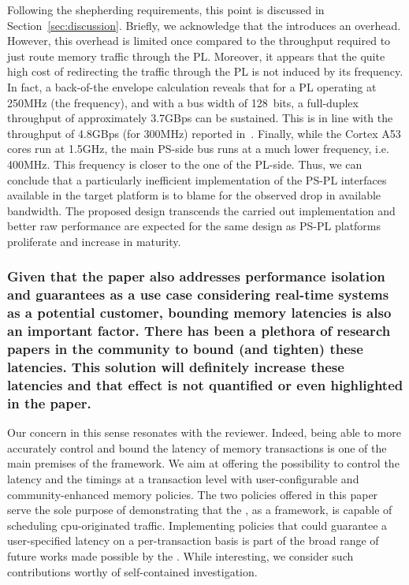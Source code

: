         Following the shepherding requirements, this point is
        discussed in Section~\ref{sec:discussion}. Briefly, we
        acknowledge that the \schim introduces an overhead. However,
        this overhead is limited once compared to the throughput
        required to just route memory traffic through the
        PL. Moreover, it appears that the quite high cost of
        redirecting the traffic through the PL is not induced by its
        frequency. In fact, a back-of-the envelope calculation reveals
        that for a PL operating at 250MHz (the \schim frequency), and
        with a bus width of 128~bits, a full-duplex throughput of
        approximately 3.7GBps can be sustained. This is in line with
        the throughput of 4.8GBps (for 300MHz) reported
        in~\cite{uiuc-xilinx-port-study}.  Finally, while the Cortex
        A53 cores run at 1.5GHz, the main PS-side bus runs at a much
        lower frequency, i.e. 400MHz. This frequency is closer to the
        one of the PL-side. Thus, we can conclude that a particularly
        inefficient implementation of the PS-PL interfaces available
        in the target platform is to blame for the observed drop in
        available bandwidth. The proposed \schim design transcends the
        carried out implementation and better raw performance are
        expected for the same design as PS-PL platforms proliferate
        and increase in maturity.

        \subsubsection{Given that the paper also addresses performance
        isolation and guarantees as a use case considering real-time
        systems as a potential customer, bounding memory latencies is
        also an important factor. There has been a plethora of
        research papers in the community to bound (and tighten) these
        latencies. This solution will definitely increase these
        latencies and that effect is not quantified or even
        highlighted in the paper.}

        Our concern in this sense resonates with the reviewer. Indeed,
        being able to more accurately control and bound the latency of
        memory transactions is one of the main premises of the \schim
        framework. We aim at offering the possibility to control the
        latency and the timings at a transaction level with
        user-configurable and community-enhanced memory policies.  The
        two policies offered in this paper serve the sole purpose of
        demonstrating that the \schim, as a framework, is capable of
        scheduling cpu-originated traffic. Implementing policies that
        could guarantee a user-specified latency on a per-transaction
        basis is part of the broad range of future works made possible
        by the \schim.  While interesting, we consider such
        contributions worthy of self-contained investigation.

